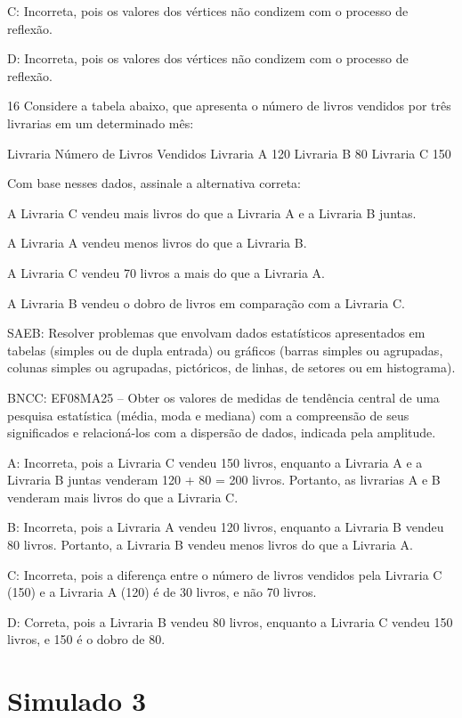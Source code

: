 {C: Incorreta, pois os valores dos vértices não condizem com o processo
de reflexão.

D: Incorreta, pois os valores dos vértices não condizem com o processo
de reflexão.

\num{16} Considere a tabela abaixo, que apresenta o número de livros vendidos
por três livrarias em um determinado mês:


Livraria Número de Livros Vendidos Livraria A 120 Livraria B 80 Livraria
C 150

Com base nesses dados, assinale a alternativa correta:
\item A Livraria C vendeu mais livros do que a Livraria A e a Livraria B
juntas.
\item A Livraria A vendeu menos livros do que a Livraria B.
\item A Livraria C vendeu 70 livros a mais do que a Livraria A.
\item A Livraria B vendeu o dobro de livros em comparação com a Livraria C.

SAEB: Resolver problemas que envolvam dados estatísticos apresentados em
tabelas (simples ou de dupla entrada) ou gráficos (barras simples ou
agrupadas, colunas simples ou agrupadas, pictóricos, de linhas, de
setores ou em histograma).

BNCC: EF08MA25 -- Obter os valores de medidas de tendência central de
uma pesquisa estatística (média, moda e mediana) com a compreensão de
seus significados e relacioná-los com a dispersão de dados, indicada
pela amplitude.

A: Incorreta, pois a Livraria C vendeu 150 livros, enquanto a Livraria A
e a Livraria B juntas venderam 120 + 80 = 200 livros. Portanto, as
livrarias A e B venderam mais livros do que a Livraria C.

B: Incorreta, pois a Livraria A vendeu 120 livros, enquanto a Livraria B
vendeu 80 livros. Portanto, a Livraria B vendeu menos livros do que a
Livraria A.

C: Incorreta, pois a diferença entre o número de livros vendidos pela
Livraria C (150) e a Livraria A (120) é de 30 livros, e não 70 livros.

D: Correta, pois a Livraria B vendeu 80 livros, enquanto a Livraria C
vendeu 150 livros, e 150 é o dobro de 80.


\section{Simulado 3}

}
